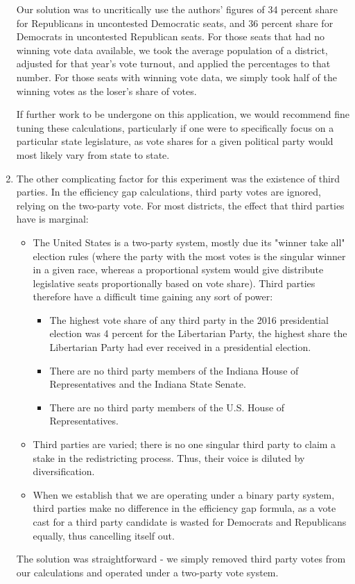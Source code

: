 \documentclass[sigconf]{acmart}
\begin{document}
\begin{enumerate}
    Our solution was to uncritically use the authors' figures of 34 percent share for Republicans in uncontested Democratic seats, and 36 percent share for Democrats in uncontested Republican seats. For those seats that had no winning vote data available, we took the average population of a district, adjusted for that year's vote turnout, and applied the percentages to that number. For those seats with winning vote data, we simply took half of the winning votes as the loser's share of votes.
    
    If further work to be undergone on this application, we would recommend fine tuning these calculations, particularly if one were to specifically focus on a particular state legislature, as vote shares for a given political party would most likely vary from state to state.
    \item The other complicating factor for this experiment was the existence of third parties. In the efficiency gap calculations, third party votes are ignored, relying on the two-party vote.\cite{gill} For most districts, the effect that third parties have is marginal:
    \begin{itemize}
        \item The United States is a two-party system, mostly due its "winner take all" election rules (where the party with the most votes is the singular winner in a given race, whereas a proportional system would give distribute legislative seats proportionally based on vote share). Third parties therefore have a difficult time gaining any sort of power:
        \begin{itemize}
            \item The highest vote share of any third party in the 2016 presidential election was 4 percent for the Libertarian Party, the highest share the Libertarian Party had ever received in a presidential election.\cite{libertarian}
            \item There are no third party members of the Indiana House of Representatives and the Indiana State Senate.\cite{senateresults2016}\cite{houseresults}
            \item There are no third party members of the U.S. House of Representatives.\cite{house}
        \end{itemize}
        \item Third parties are varied; there is no one singular third party to claim a stake in the redistricting process. Thus, their voice is diluted by diversification. 
        \item When we establish that we are operating under a binary party system, third parties make no difference in the efficiency gap formula, as a vote cast for a third party candidate is wasted for Democrats and Republicans equally, thus cancelling itself out.
    \end{itemize}
    The solution was straightforward - we simply removed third party votes from our calculations and operated under a two-party vote system.
\end{enumerate}
\end{document}
